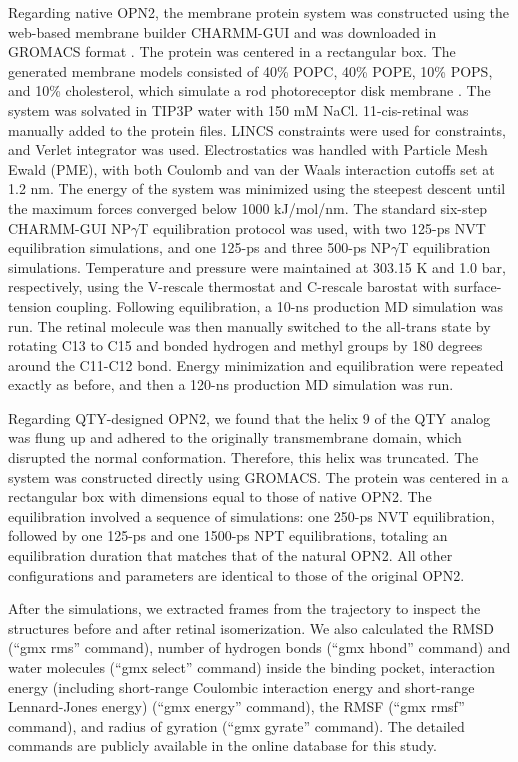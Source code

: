 \documentclass[fleqn, 10pt, lineno]{manuscript}
\begin{document}
Regarding native OPN2, the membrane protein system was constructed using the web-based membrane builder CHARMM-GUI and was downloaded in GROMACS format \citep{Jo_2008, Wu_2014, Lee_2016}. The protein was centered in a rectangular box. The generated membrane models consisted of 40\% POPC, 40\% POPE, 10\% POPS, and 10\% cholesterol, which simulate a rod photoreceptor disk membrane \citep{Albert_2005}. The system was solvated in TIP3P water with 150 mM NaCl. 11-cis-retinal was manually added to the protein files. LINCS constraints were used for constraints, and Verlet integrator was used. Electrostatics was handled with Particle Mesh Ewald (PME), with both Coulomb and van der Waals interaction cutoffs set at 1.2 nm. The energy of the system was minimized using the steepest descent until the maximum forces converged below 1000 kJ/mol/nm. The standard six-step CHARMM-GUI NP$\gamma$T equilibration protocol \citep{Jo_2008} was used, with two 125-ps NVT equilibration simulations, and one 125-ps and three 500-ps NP$\gamma$T equilibration simulations. Temperature and pressure were maintained at 303.15 K and 1.0 bar, respectively, using the V-rescale thermostat and C-rescale barostat with surface-tension coupling. Following equilibration, a 10-ns production MD simulation was run. The retinal molecule was then manually switched to the all-trans state by rotating C13 to C15 and bonded hydrogen and methyl groups by 180 degrees around the C11-C12 bond. Energy minimization and equilibration were repeated exactly as before, and then a 120-ns production MD simulation was run. 

Regarding QTY-designed OPN2, we found that the helix 9 of the QTY analog was flung up and adhered to the originally transmembrane domain, which disrupted the normal conformation. Therefore, this helix was truncated. The system was constructed directly using GROMACS. The protein was centered in a rectangular box with dimensions equal to those of native OPN2. The equilibration involved a sequence of simulations: one 250-ps NVT equilibration, followed by one 125-ps and one 1500-ps NPT equilibrations, totaling an equilibration duration that matches that of the natural OPN2. All other configurations and parameters are identical to those of the original OPN2.

After the simulations, we extracted frames from the trajectory to inspect the structures before and after retinal isomerization. We also calculated the RMSD (``gmx rms'' command), number of hydrogen bonds (``gmx hbond'' command) and water molecules (``gmx select'' command) inside the binding pocket, interaction energy (including short-range Coulombic interaction energy and short-range Lennard-Jones energy) (``gmx energy'' command), the RMSF (``gmx rmsf'' command), and radius of gyration (``gmx gyrate'' command). The detailed commands are publicly available in the online database for this study. 
\end{document}
